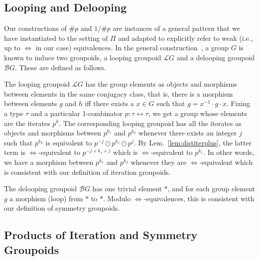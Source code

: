 \documentclass[a4paper,USenglish]{lipics-v2016-utf8x}
\newcommand{\hash}{\#}
\newcommand{\iso}{\leftrightarrow}
\newcommand{\isotwo}{\Leftrightarrow}
\newcommand{\order}[1]{\hash #1}
\newcommand{\iorder}[1]{1/\hash #1}
\newcommand{\looping}[1]{\mathcal{L}{#1}}
\newcommand{\delooping}[1]{\mathcal{B}{#1}}
\begin{document}
\subsection{Looping and Delooping}

Our constructions of $\order{p}$ and $\iorder{p}$ are instances of a general
pattern that we have instantiated to the setting of $\Pi$ and adapted to
explicitly refer to weak (i.e., up to $\isotwo$ in our case) equivalences. In
the general construction~\cite{looping}, a group $G$ is known to induce two
groupoids, a looping groupoid $\looping{G}$ and a delooping groupoid
$\delooping{G}$. These are defined as follows.

The looping groupoid $\looping{G}$ has the group elements as objects and
morphisms between elements in the same conjugacy class, that is, there is a
morphism between elements $g$ and $h$ iff there exists a $x \in G$ such that
$g = x^{-1} \cdot g \cdot x$. Fixing a type $\tau$ and a particular 1-combinator
$p : \tau \iso \tau$, we get a group whose elements are the iterates $p^k$. The
corresponding looping groupoid has all the iterates as objects and morphisms
between $p^{k_1}$ and $p^{k_2}$ whenever there exists an integer $j$ such that
$p^{k_2}$ is equivalent to $p^{-j} \odot p^{k_1} \odot p^{j}$. By
Lem.~\ref{lem:distiterplus}, the latter term is $\isotwo$-equivalent to
$p^{-j+k_1+j}$ which is $\isotwo$-equivalent to $p^{k_1}$. In other words, we
have a morphism between $p^{k_1}$ and $p^{k_2}$ whenever they are
$\isotwo$-equivalent which is consistent with our definition of iteration
groupoids.

The delooping groupoid $\delooping{G}$ has one trivial element $\ast$, and for
each group element $g$ a morphism (loop) from $\ast$ to $\ast$. Modulo
$\isotwo$-equivalences, this is consistent with our definition of symmetry
groupoids.

\subsection{Products of Iteration and Symmetry Groupoids}
\label{sub:products}
\end{document}
